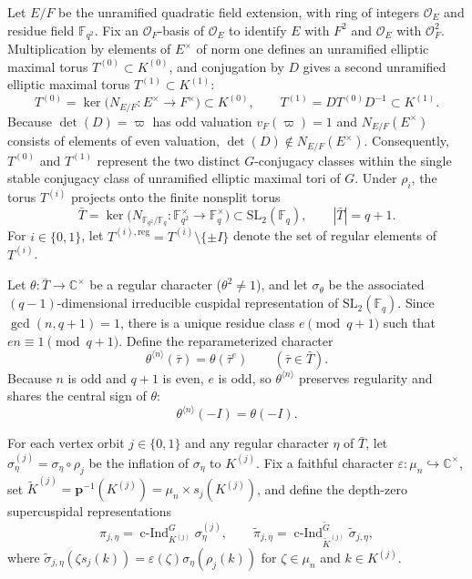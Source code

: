 \documentclass[12pt, letterpaper]{article}
\numberwithin{equation}{section}
\theoremstyle{definition}
\theoremstyle{remark}
\newcommand{\OO}{\mathcal{O}_F}
\newcommand{\kk}{\mathbb{F}_q}
\newcommand{\Gbar}{\mathrm{SL}_2(\kk)}
\newcommand{\wtG}{\widetilde{G}}
\newcommand{\cInd}{\operatorname{c-Ind}}
\begin{document}
Let $E/F$ be the unramified quadratic field extension, with ring of integers $\mathcal{O}_E$ and residue field $\mathbb{F}_{q^2}$. Fix an $\OO$-basis of $\mathcal{O}_E$ to identify $E$ with $F^2$ and $\mathcal{O}_E$ with $\OO^2$. Multiplication by elements of $E^\times$ of norm one defines an unramified elliptic maximal torus $T^{(0)}\subset K^{(0)}$, and conjugation by $D$ gives a second unramified elliptic maximal torus $T^{(1)}\subset K^{(1)}$:
\begin{equation}\label{eq:Ti-def}
 T^{(0)}=\ker\bigl(N_{E/F}:E^\times\to F^\times\bigr)\subset K^{(0)},\qquad
 T^{(1)}=DT^{(0)}D^{-1}\subset K^{(1)}.
\end{equation}
Because $\det(D)=\varpi$ has odd valuation $v_F(\varpi)=1$ and $N_{E/F}(E^\times)$ consists of elements of even valuation, $\det(D)\notin N_{E/F}(E^\times)$. Consequently, $T^{(0)}$ and $T^{(1)}$ represent the two distinct $G$-conjugacy classes within the single stable conjugacy class of unramified elliptic maximal tori of $G$. Under $\rho_i$, the torus $T^{(i)}$ projects onto the finite nonsplit torus
\begin{equation}\label{eq:Tbar-def}
 \bar{T}=\ker\bigl(N_{\mathbb{F}_{q^2}/\kk}:\mathbb{F}_{q^2}^\times\to\kk^\times\bigr)\subset\Gbar,\qquad |\bar{T}|=q+1.
\end{equation}
For $i\in\{0,1\}$, let $T^{(i),\mathrm{reg}}=T^{(i)}\setminus\{\pm I\}$ denote the set of regular elements of $T^{(i)}$.

Let $\theta:\bar{T}\to\mathbb{C}^\times$ be a regular character ($\theta^2\ne 1$), and let $\sigma_\theta$ be the associated $(q-1)$-dimensional irreducible cuspidal representation of $\Gbar$. Since $\gcd(n,q+1)=1$, there is a unique residue class $e\pmod{q+1}$ such that $en\equiv 1\pmod{q+1}$. Define the reparameterized character
\begin{equation}\label{eq:theta-power}
 \theta^{\langle n\rangle}(\bar{\tau})=\theta(\bar{\tau}^e)\qquad(\bar{\tau}\in\bar{T}).
\end{equation}
Because $n$ is odd and $q+1$ is even, $e$ is odd, so $\theta^{\langle n\rangle}$ preserves regularity and shares the central sign of $\theta$:
\begin{equation}\label{eq:central-sign}
 \theta^{\langle n\rangle}(-I)=\theta(-I).
\end{equation}

For each vertex orbit $j\in\{0,1\}$ and any regular character $\eta$ of $\bar{T}$, let $\sigma_\eta^{(j)}=\sigma_\eta\circ\rho_j$ be the inflation of $\sigma_\eta$ to $K^{(j)}$. Fix a faithful character $\varepsilon:\mu_n\hookrightarrow\mathbb{C}^\times$, set $\widetilde{K}^{(j)}=\mathbf{p}^{-1}(K^{(j)})=\mu_n\times s_j(K^{(j)})$, and define the depth-zero supercuspidal representations
\begin{equation}\label{eq:pi-defs}
 \pi_{j,\eta}=\cInd_{K^{(j)}}^G\sigma_\eta^{(j)},\qquad
 \widetilde{\pi}_{j,\eta}=\cInd_{\widetilde{K}^{(j)}}^{\wtG}\widetilde{\sigma}_{j,\eta},
\end{equation}
where $\widetilde{\sigma}_{j,\eta}(\zeta s_j(k))=\varepsilon(\zeta)\sigma_\eta(\rho_j(k))$ for $\zeta\in\mu_n$ and $k\in K^{(j)}$.
\end{document}

